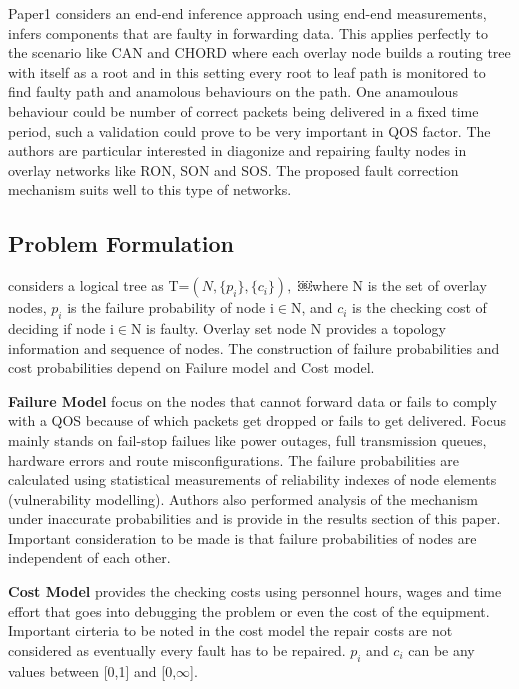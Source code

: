 \documentclass[10pt]{sigplan-proc-varsize}
\begin{document}
Paper1 considers an end-end inference approach using end-end measurements, infers components that are faulty in forwarding data. This applies perfectly to the scenario like CAN\cite{Ratnasamy:01} and CHORD\cite{Stoica:01} where each overlay node builds a routing tree with itself as a root and in this setting every root to leaf path is monitored to find faulty path and anamolous behaviours on the path. One anamoulous behaviour could be number of correct packets being delivered in a fixed time period, such a validation could prove to be very important in QOS factor.  The authors are particular interested in diagonize and repairing faulty nodes in overlay networks like RON\cite{Andersen:01}, SON\cite{Duan:03} and SOS\cite{Misra:04}. The proposed fault correction mechanism suits well to this type of  networks. 

\subsection{Problem Formulation}
\cite{pclee:07} considers a logical tree as T=$(N,\{{p_i}\},\{{c_i}\}),$ ￼where N is the set of overlay nodes, $p_i$ is the failure probability of node i$\in$N, and $c_i$ is the checking cost of deciding if node i$\in$N is faulty. Overlay set node N provides a topology information and sequence of nodes. The construction of failure probabilities and cost probabilities depend on Failure model and Cost model.

{\bf Failure Model} focus on the nodes that cannot forward data or fails to comply with a QOS because of which packets get dropped or fails to get delivered. Focus mainly stands on fail-stop failues like power outages, full transmission queues, hardware errors and route misconfigurations. The failure probabilities are calculated using statistical measurements of reliability indexes of node elements (vulnerability modelling).  Authors also performed analysis of the  mechanism under inaccurate probabilities and is provide in the results section of this paper. Important consideration to be made is that failure probabilities of nodes are independent of each other. 

{\bf Cost Model} provides the checking costs using personnel hours, wages and time effort that goes into debugging the problem or even the cost of the equipment. Important cirteria to be noted in the cost model the repair costs are not considered as eventually every fault has to be repaired. $p_i$ and $c_i$ can be any values between [0,1] and [0,$\infty$].
\end{document}
